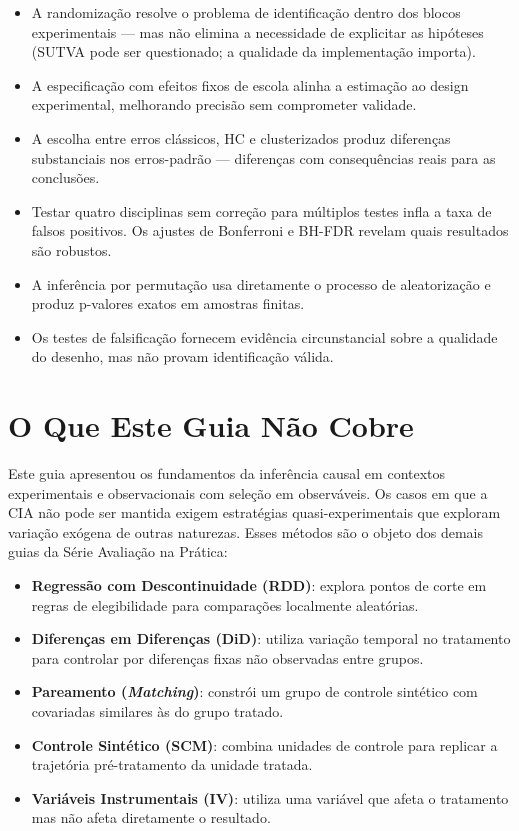 \begin{itemize}[leftmargin=*]
  \item A randomização resolve o problema de identificação dentro dos blocos
    experimentais --- mas não elimina a necessidade de explicitar as hipóteses
    (SUTVA pode ser questionado; a qualidade da implementação importa).
  \item A especificação com efeitos fixos de escola alinha a estimação ao
    design experimental, melhorando precisão sem comprometer validade.
  \item A escolha entre erros clássicos, HC e clusterizados produz diferenças
    substanciais nos erros-padrão --- diferenças com consequências reais para
    as conclusões.
  \item Testar quatro disciplinas sem correção para múltiplos testes infla a
    taxa de falsos positivos. Os ajustes de Bonferroni e BH-FDR revelam quais
    resultados são robustos.
  \item A inferência por permutação usa diretamente o processo de aleatorização
    e produz p-valores exatos em amostras finitas.
  \item Os testes de falsificação fornecem evidência circunstancial sobre a
    qualidade do desenho, mas não provam identificação válida.
\end{itemize}


\section{O Que Este Guia Não Cobre}

Este guia apresentou os fundamentos da inferência causal em contextos
experimentais e observacionais com seleção em observáveis. Os casos em que
a CIA não pode ser mantida exigem estratégias quasi-experimentais que exploram
variação exógena de outras naturezas. Esses métodos são o objeto dos demais
guias da Série Avaliação na Prática:

\begin{itemize}[leftmargin=*]
  \item \textbf{Regressão com Descontinuidade (RDD)}: explora pontos de corte
    em regras de elegibilidade para comparações localmente aleatórias.
  \item \textbf{Diferenças em Diferenças (DiD)}: utiliza variação temporal no
    tratamento para controlar por diferenças fixas não observadas entre grupos.
  \item \textbf{Pareamento (\textit{Matching})}: constrói um grupo de controle
    sintético com covariadas similares às do grupo tratado.
  \item \textbf{Controle Sintético (SCM)}: combina unidades de controle para
    replicar a trajetória pré-tratamento da unidade tratada.
  \item \textbf{Variáveis Instrumentais (IV)}: utiliza uma variável que afeta
    o tratamento mas não afeta diretamente o resultado.
\end{itemize}

